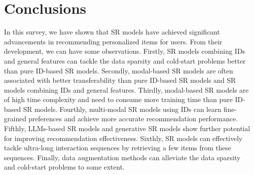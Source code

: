 \documentclass[review]{fcs}
\begin{document}
	\section{Conclusions}\label{sec:conclusions}
	In this survey, we have shown that SR models have achieved significant advancements in recommending personalized items for users. From their development, we can have some observations. Firstly, SR models combining IDs and general features can tackle the data sparsity and cold-start problems better than pure ID-based SR models. Secondly, modal-based SR models are often associated with better transferability than pure ID-based SR models and SR models combining IDs and general features. Thirdly, modal-based SR models are of high time complexity and need to consume more training time than pure ID-based SR models. Fourthly, multi-modal SR models using IDs can learn fine-grained preferences and achieve more accurate recommendation performance. Fifthly, LLMs-based SR models and generative SR models show further potential for improving recommendation effectiveness. Sixthly, SR models can effectively tackle ultra-long interaction sequences by retrieving a few items from these sequences. Finally, data augmentation methods can alleviate the data sparsity and cold-start problems to some extent.
	
\end{document}
